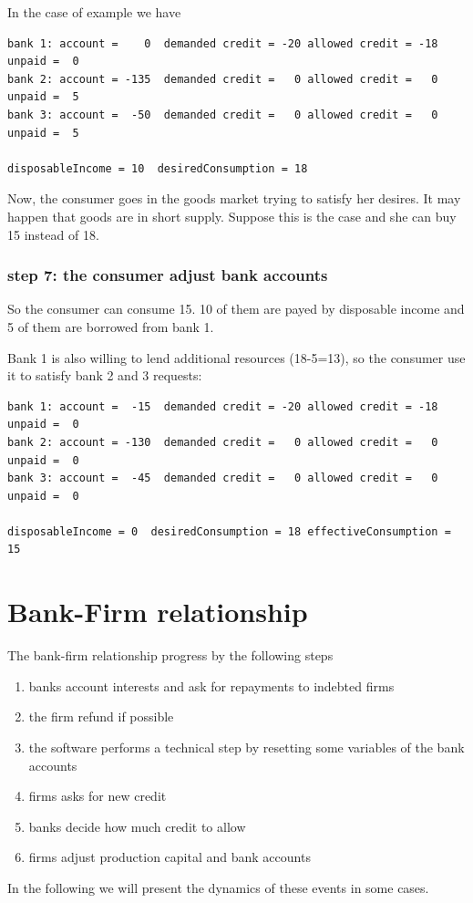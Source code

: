 \documentclass{article}
\begin{document}
In the case of example we have

\begin{verbatim}
bank 1: account =    0  demanded credit = -20 allowed credit = -18 unpaid =  0
bank 2: account = -135  demanded credit =   0 allowed credit =   0 unpaid =  5
bank 3: account =  -50  demanded credit =   0 allowed credit =   0 unpaid =  5

disposableIncome = 10  desiredConsumption = 18
\end{verbatim}

Now, the consumer goes in the goods market trying to satisfy her desires. It may happen that goods are in short supply. Suppose this is the case and she can buy 15 instead of 18. 

\subsubsection*{step 7: the consumer adjust bank accounts}

So the consumer can consume 15. 10 of them are payed by disposable income and 5 of them are borrowed from bank 1. 

Bank 1 is also willing to lend additional resources (18-5=13), so the consumer use it to satisfy bank 2 and 3 requests:

\begin{verbatim}
bank 1: account =  -15  demanded credit = -20 allowed credit = -18 unpaid =  0
bank 2: account = -130  demanded credit =   0 allowed credit =   0 unpaid =  0
bank 3: account =  -45  demanded credit =   0 allowed credit =   0 unpaid =  0

disposableIncome = 0  desiredConsumption = 18 effectiveConsumption = 15
\end{verbatim}



\section{Bank-Firm relationship}

The bank-firm relationship progress by the following steps

\begin{enumerate}
	\item banks account interests and ask for repayments to indebted firms
	\item the firm refund if possible
	\item the software performs a technical step by resetting some variables of the bank accounts
	\item firms asks for new credit
	\item banks decide how much credit to allow
	\item firms adjust production capital and bank accounts
\end{enumerate}
In the following we will present the dynamics of these events in some cases.
\end{document}
